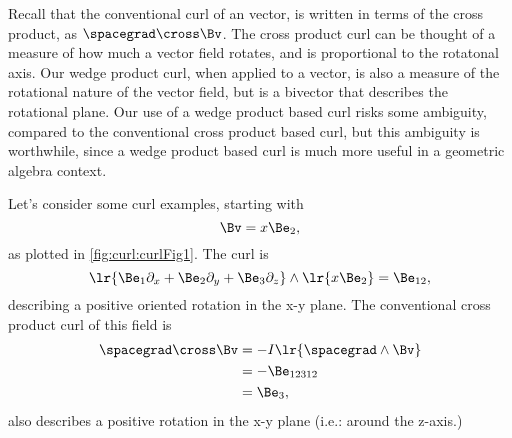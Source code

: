 %
%
Recall that the conventional curl of an  vector, is written in terms of the cross product, as \( \spacegrad \cross \Bv \).  The cross product curl can be thought of a measure of how much a vector field rotates, and is proportional to the rotatonal axis.  Our wedge product curl, when applied to a vector, is also a measure of the rotational nature of the vector field, but is a bivector that describes the rotational plane.
Our use of a wedge product based curl risks some ambiguity, compared to the conventional  cross product based curl, but this ambiguity is worthwhile, since a wedge product based curl is much more useful in a geometric algebra context.

Let's consider some curl examples, starting with
\begin{equation}\label{eqn:vectorcalc:1030}
\Bv = x \Be_2,
\end{equation}
as plotted in \cref{fig:curl:curlFig1}.
The curl is
\begin{equation}\label{eqn:vectorcalc:1050}
\lr{ \Be_1 \partial_x + \Be_2 \partial_y + \Be_3 \partial_z } \wedge \lr{ x \Be_2 }
=
\Be_{12},
\end{equation}
describing a positive oriented rotation in the x-y plane.
The conventional cross product curl of this field is
\begin{equation}\label{eqn:vectorcalc:1070}
\begin{aligned}
\spacegrad \cross \Bv
&= -I \lr{ \spacegrad \wedge \Bv }  \\
&= - \Be_{12312}  \\
&= \Be_3,
\end{aligned}
\end{equation}
also describes a positive rotation in the x-y plane (i.e.: around the z-axis.)

